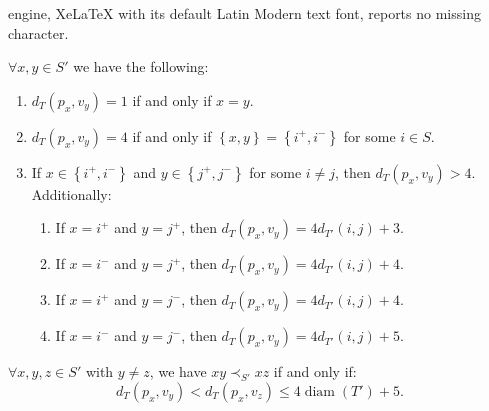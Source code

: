 \documentclass[10pt,a4paper]{amsart}
\DeclareMathOperator{\diam}{diam}
\newcommand{\set}[1]{\left\{#1\right\}}
\begin{document}
engine, XeLaTeX with its default Latin Modern text font, reports no missing character.
\begin{claim}\label{cl:p-dist-exact}
    $\forall x,y\in S'$ we have the following:
    \begin{enumerate}
        \item $d_T(p_x,v_y)=1$ if and only if $x=y$.
        \item $d_T(p_x,v_y)=4$ if and only if $\set{x,y}=\set{i^+,i^-}$ for some $i\in S$.
        \item If $x\in \set{i^+,i^-}$ and $y\in \set{j^+,j^-}$ for some $i\neq j$, then $d_T(p_x,v_y)>4$. Additionally:
        \begin{enumerate}
            \item If $x=i^+$ and $y=j^+$, then $d_T(p_x,v_y)=4d_{T'}(i,j)+3$.
            \item If $x=i^-$ and $y=j^+$, then $d_T(p_x,v_y)=4d_{T'}(i,j)+4$.
            \item If $x=i^+$ and $y=j^-$, then $d_T(p_x,v_y)=4d_{T'}(i,j)+4$.
            \item If $x=i^-$ and $y=j^-$, then $d_T(p_x,v_y)=4d_{T'}(i,j)+5$.
        \end{enumerate}
    \end{enumerate}
\end{claim}

\begin{claim}\label{cl:p-dist}
    $\forall x,y,z\in S'$ with $y \neq z$, we have $xy\prec_{S'} xz$ if and only if:
    $$d_{T}(p_x,v_y)< d_{T}(p_x,v_z)\leq 4\diam(T')+5.$$
\end{claim}
\end{document}

